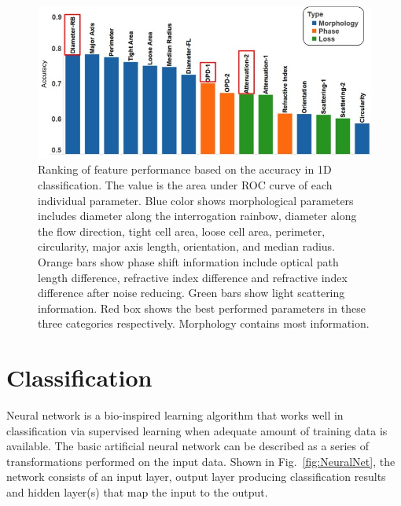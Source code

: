 \documentclass[aps,pra,reprint,superscriptaddress]{revtex4-1}
\begin{document}
\begin{figure}
\includegraphics[scale=0.55]{FigureFeaturesRank.jpg}
\caption{\label{fig:FeaturesRank} Ranking of feature performance based on the accuracy in 1D classification. The value is the area under ROC curve of each individual parameter. Blue color shows morphological parameters includes diameter along the interrogation rainbow, diameter along the flow direction, tight cell area, loose cell area, perimeter, circularity, major axis length, orientation, and median radius. Orange bars show phase shift information include optical path length difference, refractive index difference and refractive index difference after noise reducing. Green bars show light scattering information. Red box shows the best performed parameters in these three categories respectively. Morphology contains most information. }
\end{figure}

\section{Classification}

Neural network is a bio-inspired learning algorithm that works well in classification via supervised learning when adequate amount of training data is available. The basic artificial neural network can be described as a series of transformations performed on the input data. Shown in Fig.~\ref{fig:NeuralNet}, the network consists of an input layer, output layer producing classification results and hidden layer(s) that map the input to the output. 
\end{document}
